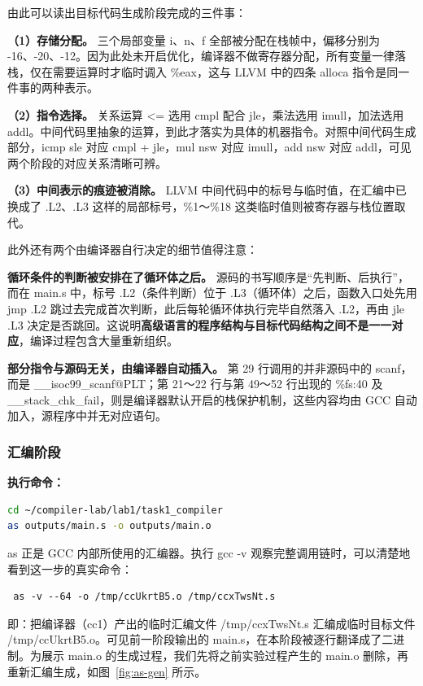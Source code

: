 \documentclass[UTF8,a4paper,10pt]{ctexart}
\begin{document}
由此可以读出目标代码生成阶段完成的三件事：

\textbf{（1）存储分配。} 三个局部变量 i、n、f 全部被分配在栈帧中，偏移分别为 -16、-20、-12。因为此处未开启优化，编译器不做寄存器分配，所有变量一律落栈，仅在需要运算时才临时调入 \%eax，这与 LLVM 中的四条 alloca 指令是同一件事的两种表示。

\textbf{（2）指令选择。} 关系运算 <= 选用 cmpl 配合 jle，乘法选用 imull，加法选用 addl。中间代码里抽象的运算，到此才落实为具体的机器指令。对照中间代码生成部分，icmp sle 对应 cmpl + jle，mul nsw 对应 imull，add nsw 对应 addl，可见两个阶段的对应关系清晰可辨。

\textbf{（3）中间表示的痕迹被消除。} LLVM 中间代码中的标号与临时值，在汇编中已换成了 .L2、.L3 这样的局部标号，\%1～\%18 这类临时值则被寄存器与栈位置取代。

此外还有两个由编译器自行决定的细节值得注意：

\textbf{循环条件的判断被安排在了循环体之后。} 源码的书写顺序是“先判断、后执行”，而在 main.s 中，标号 .L2（条件判断）位于 .L3（循环体）之后，函数入口处先用 jmp .L2 跳过去完成首次判断，此后每轮循环体执行完毕自然落入 .L2，再由 jle .L3 决定是否跳回。这说明\textbf{高级语言的程序结构与目标代码结构之间不是一一对应}，编译过程包含大量重新组织。

\textbf{部分指令与源码无关，由编译器自动插入。} 第 29 行调用的并非源码中的 scanf，而是 \_\_isoc99\_scanf@PLT；第 21～22 行与第 49～52 行出现的 \%fs:40 及 \_\_stack\_chk\_fail，则是编译器默认开启的栈保护机制，这些内容均由 GCC 自动加入，源程序中并无对应语句。

\subsubsection{汇编阶段}

\textbf{执行命令：}

\begin{lstlisting}[language=bash]
cd ~/compiler-lab/lab1/task1_compiler
as outputs/main.s -o outputs/main.o
\end{lstlisting}

as 正是 GCC 内部所使用的汇编器。执行 gcc -v 观察完整调用链时，可以清楚地看到这一步的真实命令：

\begin{lstlisting}
 as -v --64 -o /tmp/ccUkrtB5.o /tmp/ccxTwsNt.s
\end{lstlisting}

即：把编译器（cc1）产出的临时汇编文件 /tmp/ccxTwsNt.s 汇编成临时目标文件 /tmp/ccUkrtB5.o。可见前一阶段输出的 main.s，在本阶段被逐行翻译成了二进制。为展示 main.o 的生成过程，我们先将之前实验过程产生的 main.o 删除，再重新汇编生成，如图~\ref{fig:as-gen} 所示。
\end{document}
